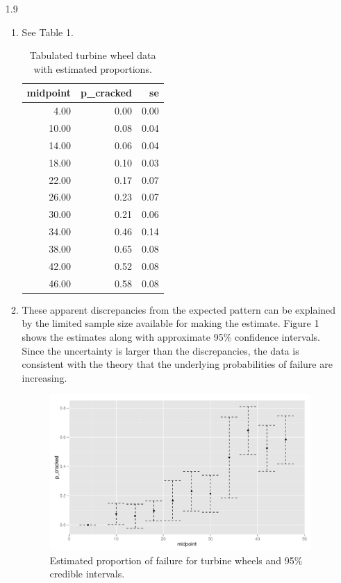 \documentclass[12pt]{article}\usepackage[]{graphicx}\usepackage[]{color}
\begin{document}
\begin{enumerate}
\begin{enumerate}
  \end{enumerate}
  \item[1.9]
  \begin{enumerate}
    \item See Table 1.
\begin{table}[ht]
\centering
\begin{tabular}{rrr}
  \hline
midpoint & p\_cracked & se \\ 
  \hline
4.00 & 0.00 & 0.00 \\ 
  10.00 & 0.08 & 0.04 \\ 
  14.00 & 0.06 & 0.04 \\ 
  18.00 & 0.10 & 0.03 \\ 
  22.00 & 0.17 & 0.07 \\ 
  26.00 & 0.23 & 0.07 \\ 
  30.00 & 0.21 & 0.06 \\ 
  34.00 & 0.46 & 0.14 \\ 
  38.00 & 0.65 & 0.08 \\ 
  42.00 & 0.52 & 0.08 \\ 
  46.00 & 0.58 & 0.08 \\ 
   \hline
\end{tabular}
\caption{Tabulated turbine wheel data with estimated proportions.} 
\end{table}
    \item
    These apparent discrepancies from the expected pattern can be explained by the limited sample size available for making the estimate. Figure 1 shows the estimates along with approximate 95\% confidence intervals. Since the uncertainty is larger than the discrepancies, the data is consistent with the theory that the underlying probabilities of failure are increasing.
  \begin{figure}[ht]
  \includegraphics[width=.8\textwidth]{cis}
  \caption{Estimated proportion of failure for turbine wheels and 95\% credible intervals.}
  \end{figure}
  

\end{enumerate}
\end{enumerate}
\end{document}
